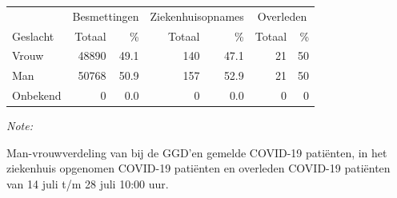 \documentclass[
  english,
  man,floatsintext]{apa6}
\begin{document}
\begin{table}
\centering\begingroup\fontsize{11}{13}\selectfont

\begin{threeparttable}
\begin{tabular}{lrrrrrr}
\toprule
\multicolumn{1}{c}{ } & \multicolumn{2}{c}{Besmettingen} & \multicolumn{2}{c}{Ziekenhuisopnames} & \multicolumn{2}{c}{Overleden} \\
\cmidrule(l{3pt}r{3pt}){2-3} \cmidrule(l{3pt}r{3pt}){4-5} \cmidrule(l{3pt}r{3pt}){6-7}
Geslacht & Totaal & \% & Totaal & \% & Totaal & \%\\
\midrule
Vrouw & 48890 & 49.1 & 140 & 47.1 & 21 & 50\\
Man & 50768 & 50.9 & 157 & 52.9 & 21 & 50\\
Onbekend & 0 & 0.0 & 0 & 0.0 & 0 & 0\\
\bottomrule
\end{tabular}
\begin{tablenotes}
\item \textit{Note: } 
\item Man-vrouwverdeling van bij de GGD’en gemelde COVID-19 patiënten, in het ziekenhuis opgenomen COVID-19 patiënten en overleden COVID-19 patiënten van 14 juli t/m 28 juli 10:00 uur.
\end{tablenotes}
\end{threeparttable}
\endgroup{}
\end{table}
\newpage
\end{document}
